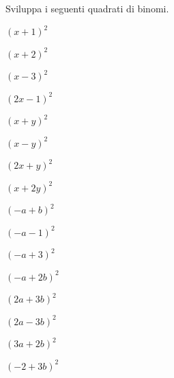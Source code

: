 \begin{esercizio}
 \label{ese:11.4}
Sviluppa i seguenti quadrati di binomi.
\begin{multicols}{4}
\begin{enumeratea}
 \item $\left(x+1\right)^{2}$
 \item $\left(x+2\right)^{2}$
 \item $\left(x-3\right)^{2}$
 \item $\left(2x-1\right)^{2}$
 \item $\left(x+y\right)^{2}$
 \item $\left(x-y\right)^{2}$
 \item $\left(2x+y\right)^{2}$
 \item $\left(x+2y\right)^{2}$
 \item $\left(-a+b\right)^{2}$
 \item $\left(-a-1\right)^{2}$
 \item $\left(-a+3\right)^{2}$
 \item $\left(-a+2b\right)^{2}$
 \item $\left(2a+3b\right)^{2}$
 \item $\left(2a-3b\right)^{2}$
 \item $\left(3a+2b\right)^{2}$
 \item $\left(-2+3b\right)^{2}$
\end{enumeratea}
\end{multicols}
\end{esercizio}

